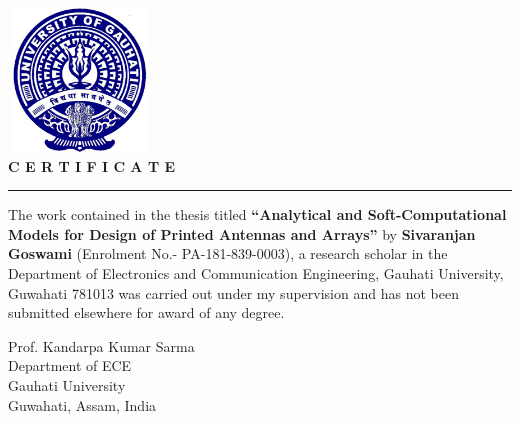 \begin{center}
\includegraphics[width=1.5in,height=1.5in]{clogoe.eps} \\
{\bf \large C E R T I F I C A T E}
\end{center}
\rule{\linewidth}{2mm} \pagestyle{empty} \vspace{0.25in}
\par

The work contained in the thesis titled {\bf ``Analytical and Soft-Computational Models for Design of Printed Antennas and Arrays''} by {\bf Sivaranjan Goswami} (Enrolment No.- PA-181-839-0003), a research scholar in the Department of Electronics and Communication Engineering, Gauhati University, Guwahati 781013
was carried out under my supervision and has not been submitted elsewhere for award of any degree.\\
\vspace*{20mm}

\bigskip\medskip



\noindent  Prof. Kandarpa Kumar Sarma\\ Department of ECE\\ Gauhati University \\ Guwahati, Assam, India\\

\noindent
\newpage 